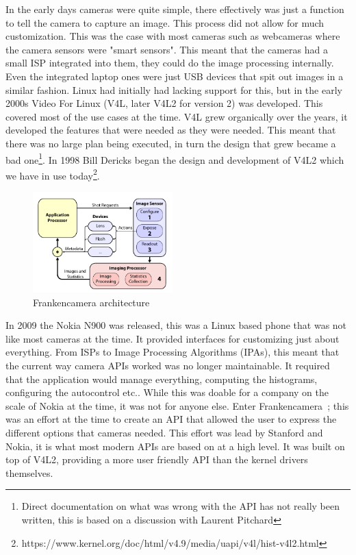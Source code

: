 In the early days cameras were quite simple, there effectively was just a
function to tell the camera to capture an image. This process did not allow for
much customization. This was the case with most cameras such as webcameras where
the camera sensors were "smart sensors". This meant that the cameras had a
small ISP integrated into them, they could do the image processing internally. Even
the integrated laptop ones were just USB devices that spit out images in a
similar fashion. Linux had initially had lacking support for this, but in the
early 2000s Video For Linux (V4L, later V4L2 for version 2) was developed. This
covered most of the use cases at the time. V4L grew organically over the years,
it developed the features that were needed as they were needed. This meant that
there was no large plan being executed, in turn the design that grew became a
bad one\footnote{Direct documentation on what was wrong with the API has not
really been written, this is based on a discussion with Laurent Pitchard}. In
1998 Bill Dericks began the design and development of V4L2 which we have in use
today\footnote{https://www.kernel.org/doc/html/v4.9/media/uapi/v4l/hist-v4l2.html}.

\begin{figure}
    \centering
    \includegraphics[width=0.48\textwidth]{figures/fcam_arch.png}
    \caption{Frankencamera architecture~\cite{adams2010frankencamera}}
    \label{fig:fcam_api}
\end{figure}

In 2009 the Nokia N900 was released, this was a Linux based phone that was not
like most cameras at the time. It provided interfaces for customizing just
about everything. From ISPs to Image Processing Algorithms (IPAs), this meant
that the current way camera APIs worked was no longer maintainable. It
required that the application would manage everything, computing the
histograms, configuring the autocontrol etc.. While this was doable for a
company on the scale of Nokia at the time, it was not for anyone else. Enter
Frankencamera~\cite{adams2010frankencamera}; this was an effort at the time
to create an API that allowed the user to express the different options that
cameras needed. This effort was lead by Stanford and Nokia, it is what most
modern APIs are based on at a high level. It was built on top of V4L2,
providing a more user friendly API than the kernel drivers themselves.

